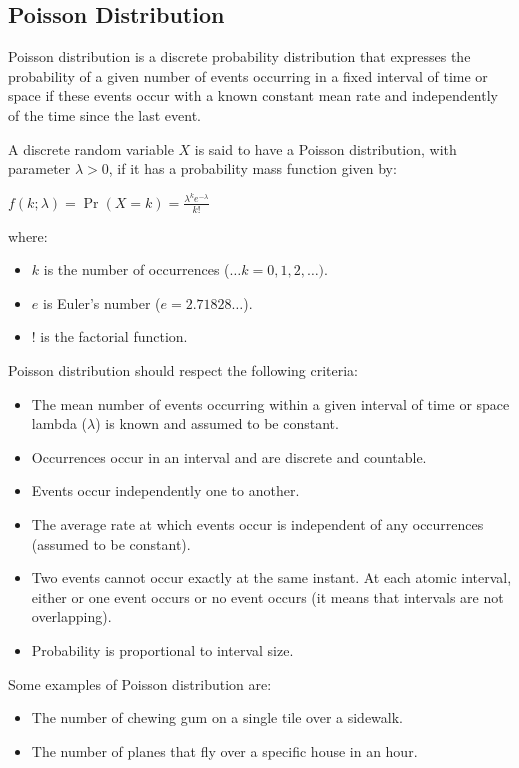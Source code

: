 \documentclass{article}
\begin{document}
\subsection{Poisson Distribution}
Poisson distribution is a discrete probability distribution that expresses the probability of a given number of events occurring in a fixed interval of time or space if these events occur with a known constant mean rate and independently of the time since the last event.

A discrete random variable $X$ is said to have a Poisson distribution, with parameter $\lambda > 0$, if it has a probability mass function given by:

$ \displaystyle f(k;\lambda )=\Pr(X{=}k)={\frac {\lambda ^{k}e^{-\lambda }}{k!}} $

where:
\begin{itemize}
    \item $k$ is the number of occurrences ($…k=0,1,2,\ldots) $.
    \item $e$ is Euler's number ($ e=2.71828\ldots$).
    \item $!$ is the factorial function.
\end{itemize}

Poisson distribution should respect the following criteria:
\begin{itemize}
    \item The mean number of events occurring within a given interval of time or space lambda ($\lambda$) is known and assumed to be constant.
    \item Occurrences occur in an interval and are discrete and countable.
    \item Events occur independently one to another.
    \item The average rate at which events occur is independent of any occurrences (assumed to be constant).
    \item Two events cannot occur exactly at the same instant. At each atomic interval, either or one event occurs or no event occurs (it means that intervals are not overlapping).
    \item Probability is proportional to interval size. 
\end{itemize}

Some examples of Poisson distribution are:
\begin{itemize}
    \item The number of chewing gum on a single tile over a sidewalk. 
    \item The number of planes that fly over a specific house in an hour.
\end{itemize}
\end{document}
